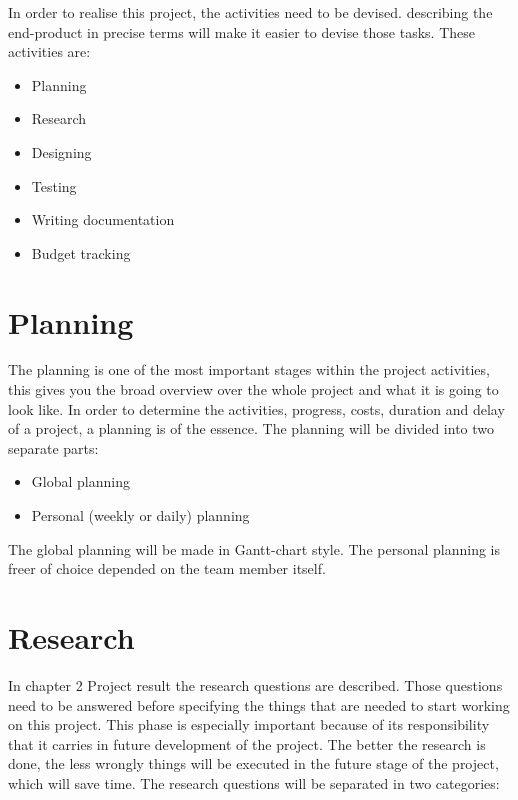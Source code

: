 In order to realise this project, the activities need to be devised. describing the end-product in precise terms will make it easier to devise those tasks. These activities are: 

\begin{itemize}
	\setlength\itemsep{-0.3em}
	\item Planning
	\item Research
	\item Designing
	\item Testing
	\item Writing documentation
	\item Budget tracking
\end{itemize}


	\section{Planning}
	
The planning is one of the most important stages within the project activities, this gives you the broad overview over the whole project and what it is going to look like. In order to determine the activities, progress, costs, duration and delay of a project, a planning is of the essence. 
The planning will be divided into two separate parts:

\begin{itemize}
	\setlength\itemsep{-0.3em}
	\item Global planning
	\item Personal (weekly or daily) planning
\end{itemize}
\noindent
The global planning will be made in Gantt-chart style. The personal planning is freer of choice depended on the team member itself. \\
	
	
	\section{Research}
	
In chapter 2 Project result the research questions are described. Those questions need to be answered before specifying the things that are needed to start working on this project. This phase is especially important because of its responsibility that it carries in future development of the project. The better the research is done, the less wrongly things will be executed in the future stage of the project, which will save time. 
The research questions will be separated in two categories: 


